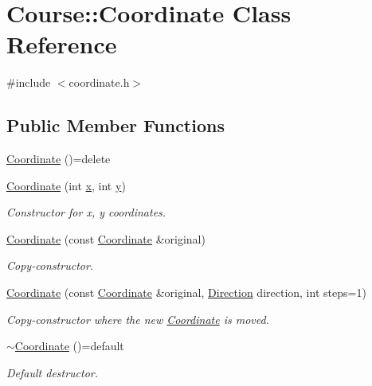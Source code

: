 \hypertarget{classCourse_1_1Coordinate}{\section{Course\-:\-:Coordinate Class Reference}
\label{classCourse_1_1Coordinate}
}


{\ttfamily \#include $<$coordinate.\-h$>$}

\subsection*{Public Member Functions}
\begin{DoxyCompactItemize}
\item 
\hyperlink{classCourse_1_1Coordinate_aca286e440d1351d787d0c31ffc954c60}{Coordinate} ()=delete
\item 
\hyperlink{classCourse_1_1Coordinate_af56be76acaf9917f2d1f35cf4ccfbc93}{Coordinate} (int \hyperlink{classCourse_1_1Coordinate_a9f680313ef06841f93bd2529dec3ca6b}{x}, int \hyperlink{classCourse_1_1Coordinate_aa5bbd123925fc7af30d61b4f11a249d1}{y})
\begin{DoxyCompactList}\small\item\em Constructor for x, y coordinates. \end{DoxyCompactList}\item 
\hyperlink{classCourse_1_1Coordinate_a18c82259eeef1cb5b3cd6e90d74ba400}{Coordinate} (const \hyperlink{classCourse_1_1Coordinate}{Coordinate} \&original)
\begin{DoxyCompactList}\small\item\em Copy-\/constructor. \end{DoxyCompactList}\item 
\hyperlink{classCourse_1_1Coordinate_ac9bcd7dd340797833364a448c2be59f4}{Coordinate} (const \hyperlink{classCourse_1_1Coordinate}{Coordinate} \&original, \hyperlink{namespaceCourse_aad6b2bd7587f1ac9c29b6693cc653931}{Direction} direction, int steps=1)
\begin{DoxyCompactList}\small\item\em Copy-\/constructor where the new \hyperlink{classCourse_1_1Coordinate}{Coordinate} is moved. \end{DoxyCompactList}\item 
\hyperlink{classCourse_1_1Coordinate_a3215c67e9fd4af40dd7682f45103777c}{$\sim$\-Coordinate} ()=default
\begin{DoxyCompactList}\small\item\em Default destructor. \end{DoxyCompactList}\item 

\end{DoxyCompactItemize}
